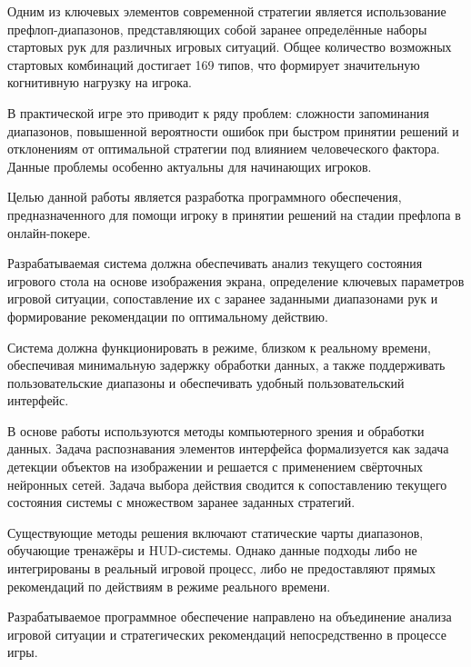 Одним из ключевых элементов современной стратегии является использование префлоп-диапазонов, представляющих собой заранее определённые наборы стартовых рук для различных игровых ситуаций. Общее количество возможных стартовых комбинаций достигает 169 типов, что формирует значительную когнитивную нагрузку на игрока.

В практической игре это приводит к ряду проблем: сложности запоминания диапазонов, повышенной вероятности ошибок при быстром принятии решений и отклонениям от оптимальной стратегии под влиянием человеческого фактора. Данные проблемы особенно актуальны для начинающих игроков.

Целью данной работы является разработка программного обеспечения, предназначенного для помощи игроку в принятии решений на стадии префлопа в онлайн-покере.

Разрабатываемая система должна обеспечивать анализ текущего состояния игрового стола на основе изображения экрана, определение ключевых параметров игровой ситуации, сопоставление их с заранее заданными диапазонами рук и формирование рекомендации по оптимальному действию.

Система должна функционировать в режиме, близком к реальному времени, обеспечивая минимальную задержку обработки данных, а также поддерживать пользовательские диапазоны и обеспечивать удобный пользовательский интерфейс.

В основе работы используются методы компьютерного зрения и обработки данных. Задача распознавания элементов интерфейса формализуется как задача детекции объектов на изображении и решается с применением свёрточных нейронных сетей. Задача выбора действия сводится к сопоставлению текущего состояния системы с множеством заранее заданных стратегий.

Существующие методы решения включают статические чарты диапазонов, обучающие тренажёры и HUD-системы. Однако данные подходы либо не интегрированы в реальный игровой процесс, либо не предоставляют прямых рекомендаций по действиям в режиме реального времени.

Разрабатываемое программное обеспечение направлено на объединение анализа игровой ситуации и стратегических рекомендаций непосредственно в процессе игры.
